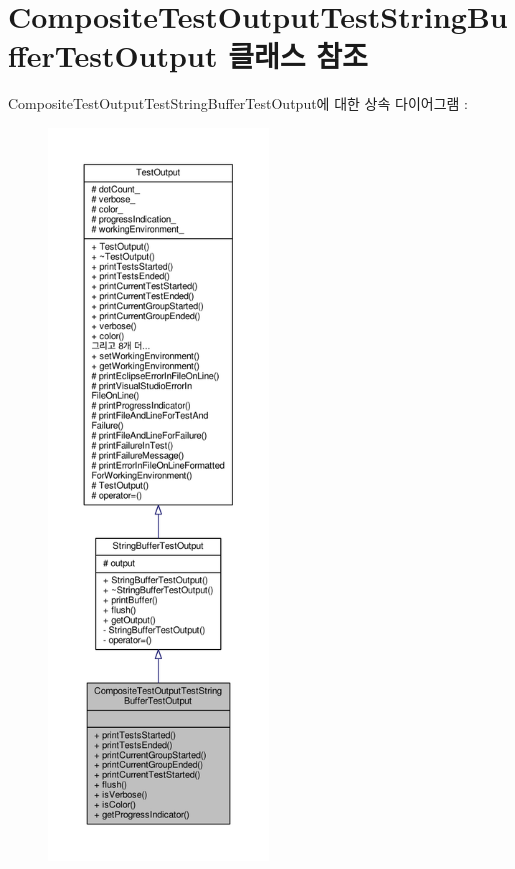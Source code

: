 \hypertarget{class_composite_test_output_test_string_buffer_test_output}{}\section{Composite\+Test\+Output\+Test\+String\+Buffer\+Test\+Output 클래스 참조}
\label{class_composite_test_output_test_string_buffer_test_output}


Composite\+Test\+Output\+Test\+String\+Buffer\+Test\+Output에 대한 상속 다이어그램 \+: 
\nopagebreak
\begin{figure}[H]
\begin{center}
\leavevmode
\includegraphics[height=550pt]{class_composite_test_output_test_string_buffer_test_output__inherit__graph}
\end{center}
\end{figure}


